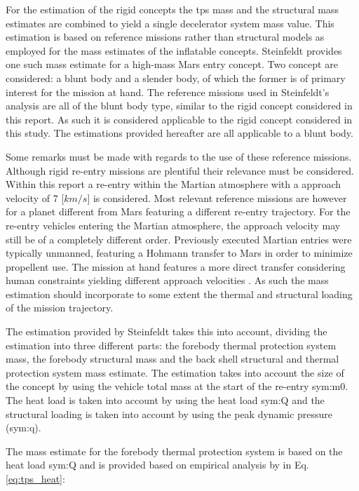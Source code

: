 For the estimation of the rigid concepts the \acrfull{tps} mass and the structural mass estimates are combined to yield a single decelerator system mass value. This estimation is based on reference missions rather than structural models as employed for the mass estimates of the inflatable concepts. Steinfeldt \cite{Steinfeldt2009} provides one such mass estimate for a high-mass Mars entry concept. Two concept are considered: a blunt body and a slender body, of which the former is of primary interest for the mission at hand. The reference missions used in Steinfeldt's analysis are all of the blunt body type, similar to the rigid concept considered in this report. As such it is considered applicable to the rigid concept considered in this study. The estimations provided hereafter are all applicable to a blunt body.

Some remarks must be made with regards to the use of these reference missions. Although rigid re-entry missions are plentiful their relevance must be considered. Within this report a re-entry within the Martian atmosphere with a approach velocity of 7 [$km/s$] is considered. Most relevant reference missions are however for a planet different from Mars featuring a different re-entry trajectory. For the re-entry vehicles entering the Martian atmosphere, the approach velocity may still be of a completely different order. Previously executed Martian entries were typically unmanned, featuring a Hohmann transfer to Mars in order to minimize propellent use. The mission at hand features a more direct transfer considering human constraints yielding different approach velocities \cite{Laub2004}. As such the mass estimation should incorporate to some extent the thermal and structural loading of the mission trajectory.

The estimation provided by Steinfeldt takes this into account, dividing the estimation into three different parts: the forebody thermal protection system mass, the forebody structural mass and the back shell structural and thermal protection system mass estimate. The estimation takes into account the size of the concept by using the vehicle total mass at the start of the re-entry \gls{sym:m0}. The heat load is taken into account by using the heat load \gls{sym:Q} and the structural loading is taken into account by using the peak dynamic pressure (\gls{sym:q}).

The mass estimate for the forebody thermal protection system is based on the heat load \gls{sym:Q} and is provided based on empirical analysis by \cite{Laub2004} in Eq.\ref{eq:tps_heat}\cite[p.7]{Steinfeldt2009}:


